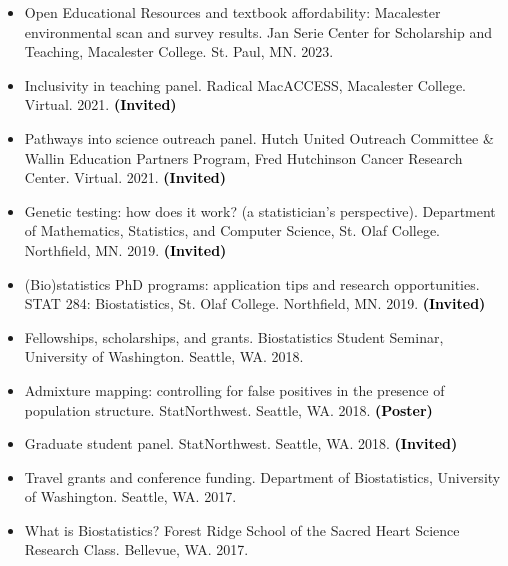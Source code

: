 \documentclass[margin]{res}
\newcommand{\annotate}[1]{\textcolor{black}{\textbf{(#1)}}}
\begin{document}
\begin{resume}
\begin{itemize}
\item[16.] Open Educational Resources and textbook affordability: Macalester environmental scan and survey results.  
Jan Serie Center for Scholarship and Teaching, Macalester College. St. Paul, MN. 2023.


\item[15.] Inclusivity in teaching panel. 
Radical MacACCESS, Macalester College. Virtual. 2021. 
\annotate{Invited}

\item[14.] Pathways into science outreach panel. 
Hutch United Outreach Committee \& Wallin Education Partners Program, Fred Hutchinson Cancer Research Center. Virtual. 2021. 
\annotate{Invited}

\item[13.] Genetic testing: how does it work? (a statistician's perspective). 
Department of Mathematics, Statistics, and Computer Science, St. Olaf College. Northfield, MN. 2019. 
\annotate{Invited}

\item[12.] (Bio)statistics PhD programs: application tips and research opportunities. 
STAT 284: Biostatistics, St. Olaf College. Northfield, MN. 2019. 
\annotate{Invited}

\item[11.] Fellowships, scholarships, and grants. 
Biostatistics Student Seminar, University of Washington. Seattle, WA. 2018.

\item[10.] %
Admixture mapping: controlling for false positives in the presence of population structure. 
StatNorthwest. Seattle, WA. 2018. 
\annotate{Poster}%

\item[9.] Graduate student panel. 
StatNorthwest. Seattle, WA. 2018. 
\annotate{Invited}

\item[8.] %
Travel grants and conference funding. 
Department of Biostatistics, University of Washington. Seattle, WA. 2017.

\item[7.] %
What is Biostatistics? 
Forest Ridge School of the Sacred Heart Science Research Class. Bellevue, WA. 2017.


\end{itemize}
\end{resume}
\end{document}

